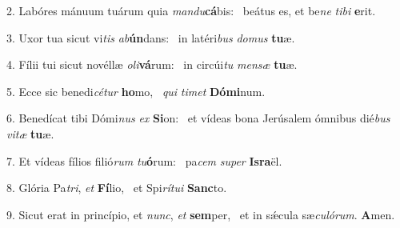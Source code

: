2. Labóres mánuum tuárum quia \textit{man}\textit{du}\textbf{cá}bis: \ast\  beátus es, et be\textit{ne} \textit{ti}\textit{bi} \textbf{e}rit.\

3. Uxor tua sicut vi\textit{tis} \textit{ab}\textbf{ún}dans: \ast\  in latéri\textit{bus} \textit{do}\textit{mus} \textbf{tu}æ.\

4. Fílii tui sicut novéllæ \textit{o}\textit{li}\textbf{vá}rum: \ast\  in circúi\textit{tu} \textit{men}\textit{sæ} \textbf{tu}æ.\

5. Ecce sic benedi\textit{cé}\textit{tur} \textbf{ho}mo, \ast\  \textit{qui} \textit{ti}\textit{met} \textbf{Dó}\textbf{mi}num.\

6. Benedícat tibi Dómi\textit{nus} \textit{ex} \textbf{Si}on: \ast\  et vídeas bona Jerúsalem ómnibus dié\textit{bus} \textit{vi}\textit{tæ} \textbf{tu}æ.\

7. Et vídeas fílios filió\textit{rum} \textit{tu}\textbf{ó}rum: \ast\  pa\textit{cem} \textit{su}\textit{per} \textbf{Is}\textbf{ra}ël.\

8. Glória Pa\textit{tri}, \textit{et} \textbf{Fí}lio, \ast\  et Spi\textit{rí}\textit{tu}\textit{i} \textbf{Sanc}to.\

9. Sicut erat in princípio, et \textit{nunc}, \textit{et} \textbf{sem}per, \ast\  et in sǽcula sæ\textit{cu}\textit{ló}\textit{rum}. \textbf{A}men.\

